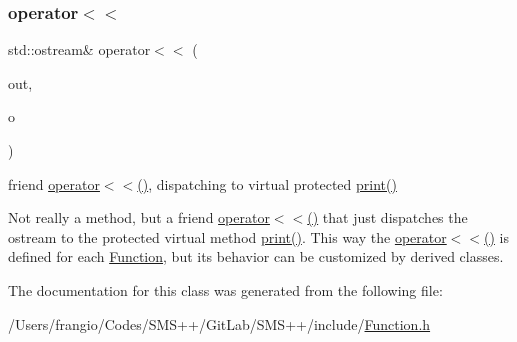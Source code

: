 \subsubsection{\texorpdfstring{operator$<$$<$}{operator<<}}
{\footnotesize\ttfamily std\+::ostream\& operator$<$$<$ (\begin{DoxyParamCaption}\item[{std\+::ostream \&}]{out,  }\item[{const \mbox{\hyperlink{class_s_m_spp__di__unipi__it_1_1_function}{Function}} \&}]{o }\end{DoxyParamCaption})\hspace{0.3cm}{\ttfamily [friend]}}



friend \mbox{\hyperlink{class_s_m_spp__di__unipi__it_1_1_function_a23b20b49c11a8fd6f9d37944f073acf2}{operator$<$$<$()}}, dispatching to virtual protected \mbox{\hyperlink{class_s_m_spp__di__unipi__it_1_1_function_a2e7b9c9148a98c5c342e8c25cac95926}{print()}} 

Not really a method, but a friend \mbox{\hyperlink{class_s_m_spp__di__unipi__it_1_1_function_a23b20b49c11a8fd6f9d37944f073acf2}{operator$<$$<$()}} that just dispatches the ostream to the protected virtual method \mbox{\hyperlink{class_s_m_spp__di__unipi__it_1_1_function_a2e7b9c9148a98c5c342e8c25cac95926}{print()}}. This way the \mbox{\hyperlink{class_s_m_spp__di__unipi__it_1_1_function_a23b20b49c11a8fd6f9d37944f073acf2}{operator$<$$<$()}} is defined for each \mbox{\hyperlink{class_s_m_spp__di__unipi__it_1_1_function}{Function}}, but its behavior can be customized by derived classes. 

The documentation for this class was generated from the following file\+:\begin{DoxyCompactItemize}
\item 
/\+Users/frangio/\+Codes/\+S\+M\+S++/\+Git\+Lab/\+S\+M\+S++/include/\mbox{\hyperlink{_function_8h}{Function.\+h}}\end{DoxyCompactItemize}
